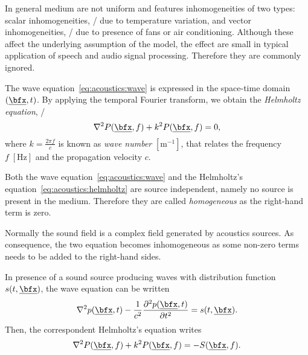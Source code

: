 In general medium are not uniform and features inhomogeneities of two types:
scalar inhomogeneities, \eg/ due to temperature variation,
and vector inhomogeneities, \eg/ due to presence of fans or air conditioning.
Although these affect the underlying assumption of the model, the effect are small in typical application of speech and audio signal processing.
Therefore they are commonly ignored.

The wave equation~\ref{eq:acoustics:wave} is expressed in the space-time domain $\depSpaceTime$.
By applying the temporal Fourier transform, we obtain the \textit{Helmholtz equation}, \ie/
\begin{equation}
    \label{eq:acoustics:helmholtz}
    \knabla^2 P(\positionMicrophone, f) + k^2 P(\positionMicrophone, f) = 0
    ,
\end{equation}
where $k = \frac{2 \pi f}{c}$  is known as \textit{wave number} $[\si{\metre^{-1}}]$, that relates the frequency $f \; [\si{\hertz}]$ and the propagation velocity $c$.

Both the wave equation~\ref{eq:acoustics:wave} and the Helmholtz's equation~\ref{eq:acoustics:helmholtz} are source independent,
namely no source is present in the medium.
Therefore they are called \textit{homogeneous} as the right-hand term is zero.

Normally the sound field is a complex field generated by acoustics sources.
As consequence, the two equation becomes inhomogeneous as some non-zero terms needs to be added to the right-hand sides.

In presence of a sound source producing waves with distribution function $s(t, \positionMicrophone)$, the wave equation can be written
\begin{equation}
    \label{eq:acoustics:source}
    \knabla^2 \pressureSpaceTime - \frac{1}{\speedOfSound^2} \kpderiv[2]{\pressureSpaceTime}{t} = s(t, \positionMicrophone)
    .
\end{equation}
Then, the correspondent Helmholtz's equation writes
\begin{equation}
    \label{eq:acoustics:source_freq}
    \knabla^2 P(\positionMicrophone, f) + k^2 P(\positionMicrophone, f) = - S(\positionMicrophone, f)
    .
\end{equation}


